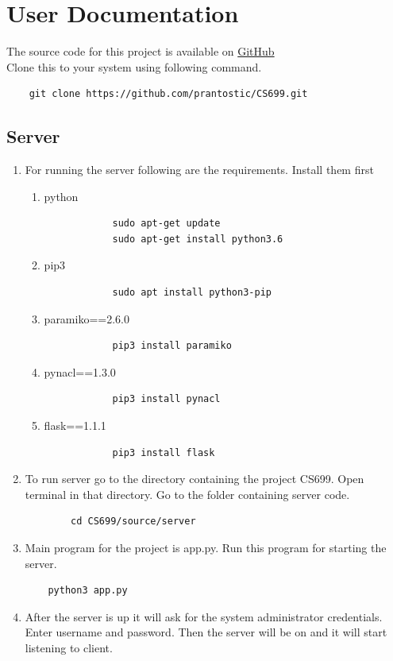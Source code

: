 \documentclass[oneside,a4paper,12pt]{article}
\begin{document}
\section{User Documentation}
The source code for this project is available on \href{https://github.com/prantostic/CS699}{GitHub} \\
Clone this to your system using following command.
\begin{verbatim} 
    git clone https://github.com/prantostic/CS699.git
    \end{verbatim}
\subsection{Server}
\begin{enumerate}

\item For running the server following are the requirements. Install them first%
    \begin{enumerate}
        \item python
        \begin{verbatim} 
            sudo apt-get update 
            sudo apt-get install python3.6
        \end{verbatim}
        \item pip3
        \begin{verbatim} 
            sudo apt install python3-pip
        \end{verbatim}
        \item paramiko==2.6.0
        \begin{verbatim}
            pip3 install paramiko
        \end{verbatim}
        \item pynacl==1.3.0
        \begin{verbatim}
            pip3 install pynacl
        \end{verbatim}
        \item flask==1.1.1
        \begin{verbatim}
            pip3 install flask
        \end{verbatim}
    \end{enumerate}

\item To run server go to the directory containing the project CS699. Open terminal in that directory. Go to the folder containing server code.
    \begin{verbatim}
        cd CS699/source/server
    \end{verbatim}

\item Main program for the project is app.py. Run this program for starting the server.
    \begin{verbatim}
    python3 app.py
    \end{verbatim}

\item After the server is up it will ask for the system administrator credentials.
Enter username and password.
Then the server will be on and it will start listening to client.
\end{enumerate}
\end{document}
